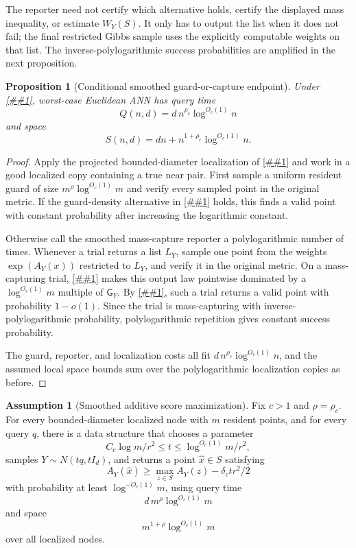 \documentclass[10pt]{article}
\newcommand{\cref}[1]{\ref{##1}}
\newtheorem{proposition}[theorem]{Proposition}
\theoremstyle{definition}
\newtheorem{assumption}[theorem]{Assumption}
\begin{document}
The reporter need not certify which alternative holds, certify the displayed
mass inequality, or estimate $W_Y(S)$. It only has to output the list when it
does not fail; the final restricted Gibbs sample uses the explicitly computable
weights on that list. The inverse-polylogarithmic success probabilities are
amplified in the next proposition.

\begin{proposition}[Conditional smoothed guard-or-capture endpoint]\label{prop:smoothed-gibbs-polylog}
   Under \cref{asm:smoothed-gibbs}, worst-case Euclidean ANN has query time
   \[
      Q(n,d)=d\,n^{\rho_c}\log^{O_c(1)}n
   \]
   and space
   \[
      S(n,d)=dn+n^{1+\rho_c}\log^{O_c(1)}n.
   \]
\end{proposition}

\begin{proof}
   Apply the projected bounded-diameter localization of \cref{lem:localization}
   and work in a good localized copy containing a true near pair. First sample
   a uniform resident guard of size $m^\rho\log^{O_c(1)}m$ and verify every
   sampled point in the original metric. If the guard-density alternative in
   \cref{asm:smoothed-gibbs} holds, this finds a valid point with constant
   probability after increasing the logarithmic constant.

   Otherwise call the smoothed mass-capture reporter a polylogarithmic number
   of times. Whenever a trial returns a list $L_Y$, sample one point from the
   weights $\exp(A_Y(x))$ restricted to $L_Y$, and verify it in the original
   metric. On a mass-capturing trial, \cref{lem:captured-gibbs-domination}
   makes this output law pointwise dominated by a $\log^{O_c(1)}m$ multiple of
   $\mathsf G_Y$. By \cref{lem:smoothed-gibbs-suffices}, such a trial returns a
   valid point with probability $1-o(1)$. Since the trial is mass-capturing
   with inverse-polylogarithmic probability, polylogarithmic repetition gives
   constant success probability.

   The guard, reporter, and localization costs all fit
   $d\,n^{\rho_c}\log^{O_c(1)}n$, and the assumed local space bounds sum over
   the polylogarithmic localization copies as before.
\end{proof}

\begin{assumption}[Smoothed additive score maximization]\label{asm:smoothed-score-max}
   Fix $c>1$ and $\rho=\rho_c$. For every bounded-diameter localized node with
   $m$ resident points, and for every query $q$, there is a data structure that
   chooses a parameter
   \[
      C_c\log m/r^2\le t\le \log^{O_c(1)}m/r^2,
   \]
   samples $Y\sim N(tq,tI_d)$, and returns a point $\widehat x\in S$ satisfying
   \[
      A_Y(\widehat x)
      \ge
      \max_{z\in S}A_Y(z)-\delta_c t r^2/2
   \]
   with probability at least $\log^{-O_c(1)}m$, using query time
   \[
      d\,m^\rho\log^{O_c(1)}m
   \]
   and space
   \[
      m^{1+\rho}\log^{O_c(1)}m
   \]
   over all localized nodes.
\end{assumption}
\end{document}

